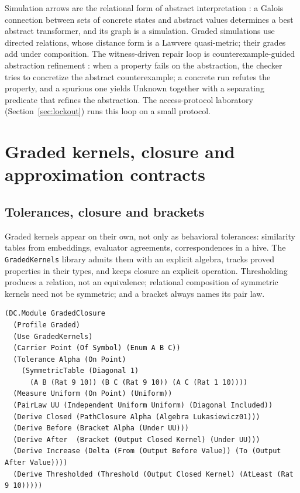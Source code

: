 \documentclass[11pt]{article}
\newcommand{\code}[1]{\texttt{#1}}
\theoremstyle{definition}
\theoremstyle{plain}
\begin{document}
Simulation arrows are the relational form of abstract interpretation \cite{cousot}: a Galois
connection between sets of concrete states and abstract values determines a best abstract
transformer, and its graph is a simulation. Graded simulations use directed relations, whose
distance form is a Lawvere quasi-metric; their grades add under composition. The witness-driven
repair loop is counterexample-guided abstraction refinement \cite{cegar}: when a property fails on
the abstraction, the checker tries to concretize the abstract counterexample; a concrete run refutes
the property, and a spurious one yields Unknown together with a separating predicate that refines
the abstraction. The access-protocol laboratory (Section~\ref{sec:lockout}) runs this loop on a
small protocol.

\section{Graded kernels, closure and approximation contracts}\label{sec:kernels}

\subsection{Tolerances, closure and brackets}

Graded kernels appear on their own, not only as behavioral tolerances: similarity tables from
embeddings, evaluator agreements, correspondences in a hive. The \code{GradedKernels} library
admits them with an explicit algebra, tracks proved properties in their types, and keeps closure an
explicit operation. Thresholding produces a relation, not an equivalence; relational composition of
symmetric kernels need not be symmetric; and a bracket always names its pair law.

\begin{lstlisting}[basicstyle=\ttfamily\footnotesize,title={\scriptsize\ttfamily fixtures/graded\_closure.metta}]
(DC.Module GradedClosure
  (Profile Graded)
  (Use GradedKernels)
  (Carrier Point (Of Symbol) (Enum A B C))
  (Tolerance Alpha (On Point)
    (SymmetricTable (Diagonal 1)
      (A B (Rat 9 10)) (B C (Rat 9 10)) (A C (Rat 1 10))))
  (Measure Uniform (On Point) (Uniform))
  (PairLaw UU (Independent Uniform Uniform) (Diagonal Included))
  (Derive Closed (PathClosure Alpha (Algebra Lukasiewicz01)))
  (Derive Before (Bracket Alpha (Under UU)))
  (Derive After  (Bracket (Output Closed Kernel) (Under UU)))
  (Derive Increase (Delta (From (Output Before Value)) (To (Output After Value))))
  (Derive Thresholded (Threshold (Output Closed Kernel) (AtLeast (Rat 9 10)))))
\end{lstlisting}
\end{document}
